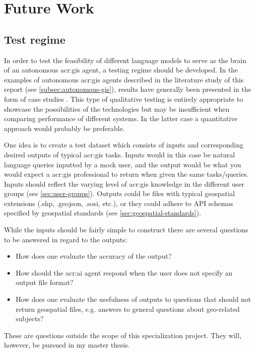 \section{Future Work}
\label{sec:futureWork}

\subsection{Test regime}

In order to test the feasibility of different language models to serve as the brain of an autonomous \acrshort{acr:gis} agent, a testing regime should be developed. In the examples of autonomous \acrshort{acr:gis} agents described in the literature study of this report (see \autoref{subsec:autonomous-gis}), results have generally been presented in the form of case studies \citep{liAutonomousGISNextgeneration2023,zhangGeoGPTUnderstandingProcessing2023}. This type of qualitative testing is entirely appropriate to showcase the possibilities of the technologies but may be insufficient when comparing performance of different systems. In the latter case a quantitative approach would probably be preferable.

One idea is to create a test dataset which consists of inputs and corresponding desired outputs of typical \acrshort{acr:gis} tasks. Inputs would in this case be natural language queries inputted by a mock user, and the output would be what you would expect a \acrshort{acr:gis} professional to return when given the same tasks/queries. Inputs should reflect the varying level of \acrshort{acr:gis} knowledge in the different user groups (see \autoref{sec:user-groups}). Outputs could be files with typical geospatial extensions (.shp, .geojson, .sosi, etc.), or they could adhere to API schemas specified by geospatial standards (see \autoref{sec:geospatial-standards}).

While the inputs should be fairly simple to construct there are several questions to be answered in regard to the outputs:

\begin{itemize}
    \item How does one evaluate the accuracy of the output?
    \item How should the \acrshort{acr:ai} agent respond when the user does not specify an output file format?
    \item How does one evaluate the usefulness of outputs to questions that should not return geospatial files, e.g. answers to general questions about geo-related subjects?
\end{itemize}

These are questions outside the scope of this specialization project. They will, however, be pursued in my master thesis.



